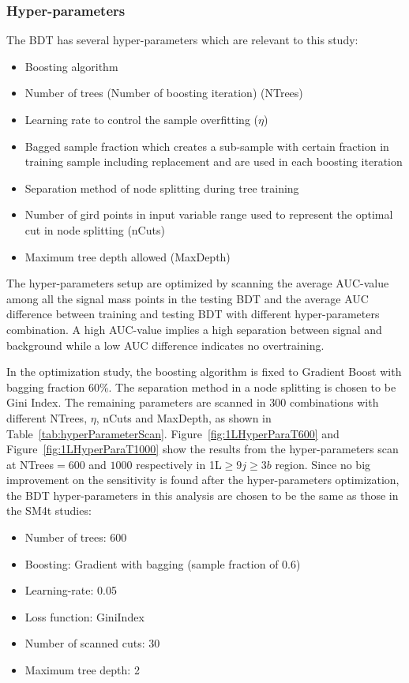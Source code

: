 
\subsubsection{Hyper-parameters}

The BDT has several hyper-parameters which are relevant to this study:

\begin{itemize}
\item Boosting algorithm
\item Number of trees (Number of boosting iteration) (NTrees)
\item Learning rate to control the sample overfitting ($\eta$)
\item Bagged sample fraction which creates a sub-sample with certain fraction in training sample including replacement and are used in each boosting iteration  
\item Separation method of node splitting during tree training
\item Number of gird points in input variable range used to represent the optimal cut in node splitting (nCuts)
\item Maximum tree depth allowed (MaxDepth)
\end{itemize}

The hyper-parameters setup are optimized by scanning the average AUC-value among all the signal mass points in the testing BDT and the average AUC difference between training and testing BDT with different hyper-parameters combination.
A high AUC-value implies a high separation between signal and background while a low AUC difference indicates no overtraining.

In the optimization study, the boosting algorithm is fixed to Gradient Boost with bagging fraction 60\%.
The separation method in a node splitting is chosen to be Gini Index.
The remaining parameters are scanned in 300 combinations with different NTrees, $\eta$, nCuts and MaxDepth, as shown in Table~\ref{tab:hyperParameterScan}.
Figure~\ref{fig:1LHyperParaT600} and Figure~\ref{fig:1LHyperParaT1000} show the results from the hyper-parameters scan at NTrees$=600$ and $1000$ respectively in 1L$\geq 9j\geq 3b$ region.
Since no big improvement on the sensitivity is found after the hyper-parameters optimization, the BDT hyper-parameters in this analysis are chosen to be the same as those in the SM4t studies:

\begin{itemize}
\item Number of trees: 600
\item Boosting: Gradient with bagging (sample fraction of 0.6)
\item Learning-rate: 0.05
\item Loss function: GiniIndex
\item Number of scanned cuts: 30
\item Maximum tree depth: 2
\end{itemize}

